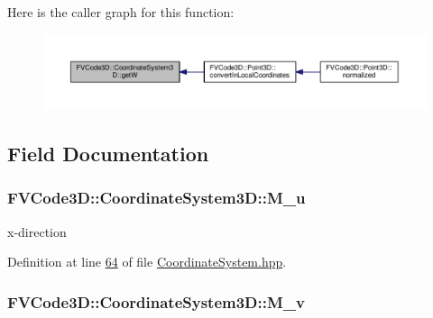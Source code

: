 Here is the caller graph for this function\+:
\nopagebreak
\begin{figure}[H]
\begin{center}
\leavevmode
\includegraphics[width=350pt]{classFVCode3D_1_1CoordinateSystem3D_a88b87127a11f8fb54b9aac8a46145c21_icgraph}
\end{center}
\end{figure}




\subsection{Field Documentation}
\subsubsection[{\texorpdfstring{M\+\_\+u}{M_u}}]{ F\+V\+Code3\+D\+::\+Coordinate\+System3\+D\+::\+M\+\_\+u\hspace{0.3cm}{\ttfamily [private]}}\hypertarget{classFVCode3D_1_1CoordinateSystem3D_a29111cacf2f4162819d01c75d79fd0b5}{}\label{classFVCode3D_1_1CoordinateSystem3D_a29111cacf2f4162819d01c75d79fd0b5}


x-\/direction 



Definition at line \hyperlink{CoordinateSystem_8hpp_source_l00064}{64} of file \hyperlink{CoordinateSystem_8hpp_source}{Coordinate\+System.\+hpp}.

\subsubsection[{\texorpdfstring{M\+\_\+v}{M_v}}]{ F\+V\+Code3\+D\+::\+Coordinate\+System3\+D\+::\+M\+\_\+v\hspace{0.3cm}{\ttfamily [private]}}\hypertarget{classFVCode3D_1_1CoordinateSystem3D_a9633fb461a4e62882f855d2aa372fe1a}{}\label{classFVCode3D_1_1CoordinateSystem3D_a9633fb461a4e62882f855d2aa372fe1a}


